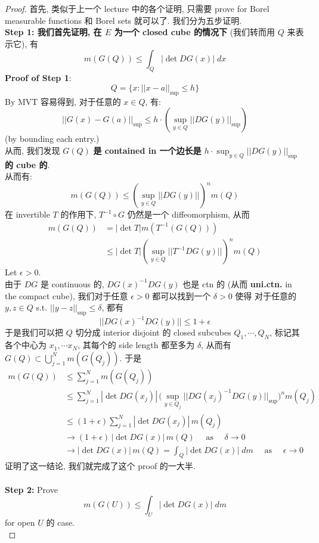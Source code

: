 \documentclass[lang=cn,11pt]{elegantbook}
\begin{document}
\begin{proof}
首先, 类似于上一个 lecture 中的各个证明, 只需要 prove for Borel measurable functions 和 Borel sets 就可以了. 我们分为五步证明.\\
\textbf{Step 1: 我们首先证明, 在 $E$ 为一个 closed cube 的情况下} (我们转而用 $Q$ 来表示它), 有 \[
m(G(Q)) \leq \int_Q |\det DG(x)| \; dx
\]
\textbf{Proof of Step 1}: \[Q = \{x : ||x-a||_{\sup} \leq h\}  \]
By MVT 容易得到, 对于任意的 $x\in Q$, 有: \[
||G(x)-G(a)||_{\sup} \leq h \cdot ({\sup}_{y\in Q} ||DG(y)||_{\sup})
\]
(by bounding each entry.)\\
从而, 我们发现  $G(Q)$ \textbf{是 contained in 一个边长是 $h \cdot {\sup}_{y\in Q} ||DG(y)||_{\sup} $ 的 cube 的}.\\
从而有: \[
m(G(Q)) \leq ({\sup}_{y\in Q} ||DG(y)||)^n m(Q)
\]
在 invertible $T$ 的作用下, $T^{-1}\circ G$ 仍然是一个 diffeomorphism, 从而 
\begin{align}
    m(G(Q)) &= |\det T| m(T^{-1}(G(Q))) \\
    &\leq |\det T|({\sup}_{y\in Q} ||T^{-1}DG(y)||)^n m(Q)
\end{align}
Let $\epsilon >0$.\\
由于 $DG$ 是 continuous 的, $DG(x)^{-1} DG(y)$ 也是 ctn 的 (从而 \textbf{uni.ctn.} in the compact cube), 我们对于任意 $\epsilon > 0$ 都可以找到一个 $\delta >0 $ 使得 对于任意的 $y,z \in Q$ s.t. $||y-z||_{\sup} \leq \delta$, 都有 
\[ ||DG(x)^{-1} DG(y)||    \leq 1+ \epsilon\]
于是我们可以把 $Q$ 切分成 interior disjoint 的 closed subcubes $Q_1,\cdots,Q_N$, 标记其各个中心为 $x_1,\cdots x_N$, 其每个的 side length 都至多为 $\delta$,  从而有 $G(Q) \subset \bigcup_{j=1}^N m(G(Q_j)) $. 
于是
\begin{align}
    m(G(Q)) &\leq \sum_{j=1}^N m(G(Q_j)) \\
    & \leq \sum_{j=1}^N |\det DG(x_j)| \, \big( {\sup}_{y\in Q_j} ||DG(x_j)^{-1} DG(y)||_{\sup}\big)^n m(Q_j)\\
    &\leq (1 + \epsilon) \sum_{j=1}^N |\det DG(x_j)| \, m(Q_j)\\
&    \rightarrow  (1+\epsilon)\,|\det DG(x)| \,m(Q) \quad \text{ as } \quad\delta\to 0 \\
& \rightarrow |\det DG(x)| \,m(Q)=\int_Q |\det DG(x)| \; dm \quad \text{ as } \quad\epsilon\to 0
\end{align}
证明了这一结论, 我们就完成了这个 proof 的一大半.\\\\
\textbf{Step 2: }Prove \[m(G(U)) \leq \int_U|\det DG(x)| \; dm\] for open $U$ 的 case.\\

\end{proof}
\end{document}
